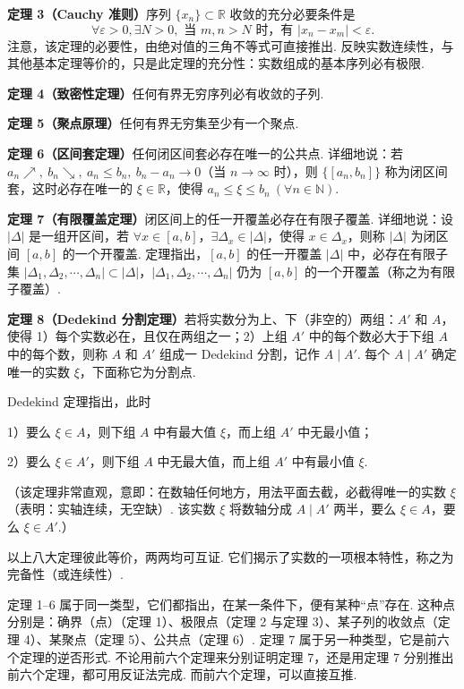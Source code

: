 \documentclass[UTF8, 12pt, fontset=fandol, oneside]{ctexart}
\begin{document}
\noindent\textbf{定理 3（Cauchy 准则）}\quad 序列 $\{x_n\}\subset\mathbb{R}$ 收敛的充分必要条件是
\[
  \forall \varepsilon>0,\exists N>0,\text{ 当 }m,n>N\text{ 时，有 }|x_n-x_m|<\varepsilon.
\]
注意，该定理的必要性，由绝对值的三角不等式可直接推出. 反映实数连续性，与其他基本定理等价的，只是此定理的充分性：实数组成的基本序列必有极限.

\noindent\textbf{定理 4（致密性定理）}\quad 任何有界无穷序列必有收敛的子列.

\noindent\textbf{定理 5（聚点原理）}\quad 任何有界无穷集至少有一个聚点.

\noindent\textbf{定理 6（区间套定理）}\quad 任何闭区间套必存在唯一的公共点. 详细地说：若 $a_n\nearrow,\ b_n\searrow,\ a_n\le b_n,\ b_n-a_n\to0$（当 $n\to\infty$ 时），则 $\{[a_n,b_n]\}$ 称为闭区间套，这时必存在唯一的 $\xi\in\mathbb{R}$，使得 $a_n\le \xi\le b_n\ (\forall n\in\mathbb{N})$.

\noindent\textbf{定理 7（有限覆盖定理）}\quad 闭区间上的任一开覆盖必存在有限子覆盖. 详细地说：设 $|\Delta|$ 是一组开区间，若 $\forall x\in[a,b]$，$\exists\Delta_x\in|\Delta|$，使得 $x\in\Delta_x$，则称 $|\Delta|$ 为闭区间 $[a,b]$ 的一个开覆盖. 定理指出，$[a,b]$ 的任一开覆盖 $|\Delta|$ 中，必存在有限子集 $|\Delta_1,\Delta_2,\cdots,\Delta_n|\subset|\Delta|$，$|\Delta_1,\Delta_2,\cdots,\Delta_n|$ 仍为 $[a,b]$ 的一个开覆盖（称之为有限子覆盖）.

\noindent\textbf{定理 8（Dedekind 分割定理）}\quad 若将实数分为上、下（非空的）两组：$A'$ 和 $A$，使得
1）每个实数必在，且仅在两组之一；2）上组 $A'$ 中的每个数必大于下组 $A$ 中的每个数，则称 $A$ 和 $A'$ 组成一 Dedekind 分割，记作 $A\mid A'$. 每个 $A\mid A'$ 确定唯一的实数 $\xi$，下面称它为分割点.

Dedekind 定理指出，此时

1）要么 $\xi\in A$，则下组 $A$ 中有最大值 $\xi$，而上组 $A'$ 中无最小值；

2）要么 $\xi\in A'$，则下组 $A$ 中无最大值，而上组 $A'$ 中有最小值 $\xi$.

（该定理非常直观，意即：在数轴任何地方，用法平面去截，必截得唯一的实数 $\xi$（表明：实轴连续，无空缺）. 该实数 $\xi$ 将数轴分成 $A\mid A'$ 两半，要么 $\xi\in A$，要么 $\xi\in A'$.）

以上八大定理彼此等价，两两均可互证. 它们揭示了实数的一项根本特性，称之为完备性（或连续性）.

定理 1--6 属于同一类型，它们都指出，在某一条件下，便有某种“点”存在. 这种点分别是：确界（点）（定理 1）、极限点（定理 2 与定理 3）、某子列的收敛点（定理 4）、某聚点（定理 5）、公共点（定理 6）. 定理 7 属于另一种类型，它是前六个定理的逆否形式. 不论用前六个定理来分别证明定理 7，还是用定理 7 分别推出前六个定理，都可用反证法完成. 而前六个定理，可以直接互推.
\end{document}
